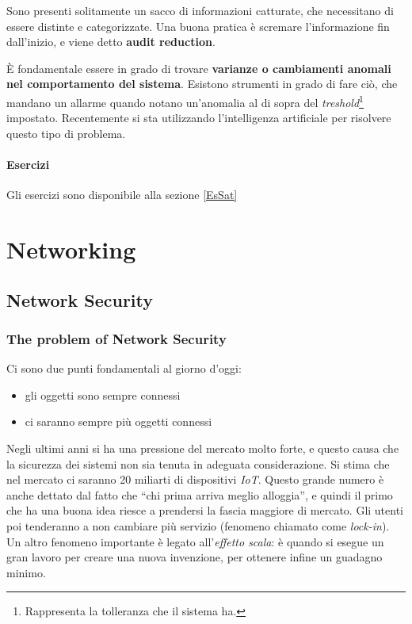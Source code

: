 Sono presenti solitamente un sacco di informazioni catturate, che necessitano 
di essere distinte e categorizzate.
Una buona pratica è scremare l'informazione fin dall'inizio, e viene detto 
\textbf{audit reduction}.

È fondamentale essere in grado di trovare \textbf{varianze o cambiamenti 
anomali nel comportamento del sistema}. Esistono strumenti in grado di fare 
ciò, che mandano un allarme quando notano un'anomalia al di sopra del 
\textit{treshold}\footnote{Rappresenta la tolleranza che il sistema ha.} 
impostato. Recentemente si sta utilizzando l'intelligenza artificiale per 
risolvere questo tipo di problema.

\subsection{Esercizi}

Gli esercizi sono disponibile alla sezione \ref{EsSat}


\part{Networking}

\label{net}

\chapter{Network Security}

\section{The problem of Network Security}

Ci sono due punti fondamentali al giorno d'oggi:

\begin{itemize}
\item gli oggetti sono sempre connessi
\item ci saranno sempre più oggetti connessi
\end{itemize}

Negli ultimi anni si ha una pressione del mercato molto forte, e questo causa 
che la sicurezza dei sistemi non sia tenuta in adeguata considerazione. Si 
stima che nel mercato ci saranno 20 miliarti di dispositivi \textit{IoT}. 
Questo grande numero è anche dettato dal fatto che ``chi prima arriva meglio 
alloggia'', e quindi il primo che ha una buona idea riesce a prendersi la 
fascia maggiore di mercato. Gli utenti poi tenderanno a non cambiare più 
servizio (fenomeno chiamato come \textit{lock-in}). Un altro fenomeno 
importante è legato all'\textit{effetto scala}: è quando si esegue un gran 
lavoro per creare una nuova invenzione, per ottenere infine un guadagno minimo.

